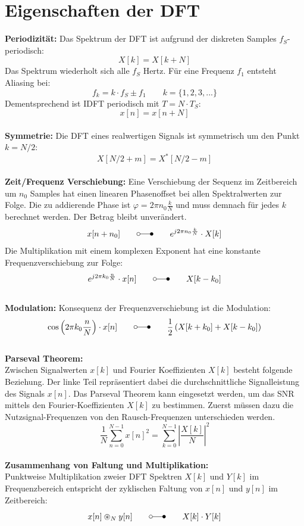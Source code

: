 \section{Eigenschaften der DFT}
\textbf{Periodizität:}
Das Spektrum der DFT ist aufgrund der diskreten Samples $f_S$-periodisch:
\[ X[k] = X[k+N] \]
Das Spektrum wiederholt sich alle $f_S$ Hertz. Für eine Frequenz $f_1$ entsteht Aliasing bei:
\[ f_k = k \cdot f_S \pm f_1 \qquad k= \{1, 2, 3, ...\} \]
Dementsprechend ist IDFT periodisch mit $T=N\cdot T_S$:
\[ x[n] = x[n+N] \]\\
\textbf{Symmetrie:}
Die DFT eines realwertigen Signals ist symmetrisch um den Punkt $k=N/2$:
\[ X[N/2+m] = X^*[N/2-m] \]\\
\textbf{Zeit/Frequenz Verschiebung:} Eine Verschiebung der Sequenz im Zeitbereich um $n_0$ Samples hat einen linearen 
Phasenoffset bei allen Spektralwerten zur Folge. Die zu addierende Phase ist $\varphi=2\pi n_0 \frac{k}{N}$ und muss 
demnach für jedes $k$ berechnet werden. Der Betrag bleibt unverändert.
\[ x[n+n_0] \qquad \laplace \qquad e^{j 2\pi n_0 \frac{k}{N}} \cdot X[k] \]
Die Multiplikation mit einem komplexen Exponent hat eine konstante
Frequenzverschiebung zur Folge:
\[ e^{j 2\pi k_0 \frac{n}{N}} \cdot x[n] \qquad \laplace \qquad X[k-k_0] \]\\
\textbf{Modulation:} Konsequenz der Frequenzverschiebung ist die Modulation:
\[ \cos\left(2\pi k_0\frac{n}{N}\right) \cdot x[n] \qquad\laplace\qquad
	\frac{1}{2}\left( X[k+k_0] + X[k-k_0] \right) \]\\
\textbf{Parseval Theorem:}\\
Zwischen Signalwerten $x[k]$ und Fourier Koeffizienten $X[k]$ besteht folgende
Beziehung. Der linke Teil repräsentiert dabei die durchschnittliche Signalleistung
des Signals $x[n]$. Das Parseval Theorem kann eingesetzt werden, um das SNR mittels 
den Fourier-Koeffizienten $X[k]$ zu bestimmen. Zuerst müssen dazu die Nutzsignal-Frequenzen 
von den Rausch-Frequenzen unterschieden werden.
\[ \frac{1}{N} \sum_{n=0}^{N-1}x[n]^2 = \sum_{k=0}^{N-1}\left| 
	\frac{X[k]}{N} \right|^2  \]\\
\textbf{Zusammenhang von Faltung und Multiplikation:}\\
Punktweise Multiplikation zweier DFT Spektren $X[k]$ und $Y[k]$ im 
Frequenzbereich entspricht der zyklischen Faltung von $x[n]$ und $y[n]$ im 
Zeitbereich:
\[ x[n] \circledast_N y[n] \qquad\laplace\qquad X[k]\cdot Y[k] \]

